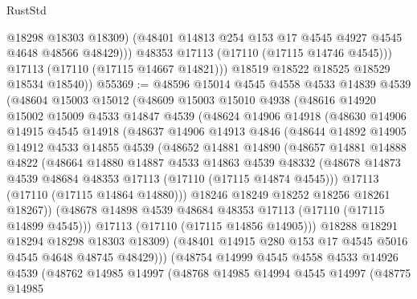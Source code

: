 \begin{lexlean}{RustStd}
\begin{coremodule}
                  @18298
                  @18303
                  @18309)
                (@48401 @14813 @254 @153 @17 @4545 @4927 @4545 @4648 @48566 @48429)))
            @48353
            @17113
            (@17110 (@17115 @14746 @4545)))
          @17113
          (@17110 (@17115 @14667 @14821)))
        @18519
        @18522
        @18525
        @18529
        @18534
        @18540))
@55369 := @48596
    @15014
    @4545
    @4558
    @4533
    @14839
    @4539
    (@48604
      @15003
      @15012
      (@48609
        @15003
        @15010
        @4938
        (@48616
          @14920
          @15002
          @15009
          @4533
          @14847
          @4539
          (@48624
            @14906
            @14918
            (@48630
              @14906
              @14915
              @4545
              @14918
              (@48637
                @14906
                @14913
                @4846
                (@48644
                  @14892
                  @14905
                  @14912
                  @4533
                  @14855
                  @4539
                  (@48652
                    @14881
                    @14890
                    (@48657
                      @14881
                      @14888
                      @4822
                      (@48664
                        @14880
                        @14887
                        @4533
                        @14863
                        @4539
                        @48332
                        (@48678 @14873 @4539 @48684 @48353 @17113 (@17110 (@17115 @14874 @4545)))
                        @17113
                        (@17110 (@17115 @14864 @14880)))
                      @18246
                      @18249
                      @18252
                      @18256
                      @18261
                      @18267))
                  (@48678 @14898 @4539 @48684 @48353 @17113 (@17110 (@17115 @14899 @4545)))
                  @17113
                  (@17110 (@17115 @14856 @14905)))
                @18288
                @18291
                @18294
                @18298
                @18303
                @18309)
              (@48401 @14915 @280 @153 @17 @4545 @5016 @4545 @4648 @48745 @48429)))
          (@48754
            @14999
            @4545
            @4558
            @4533
            @14926
            @4539
            (@48762
              @14985
              @14997
              (@48768
                @14985
                @14994
                @4545
                @14997
                (@48775
                  @14985

\end{coremodule}
\end{lexlean}
